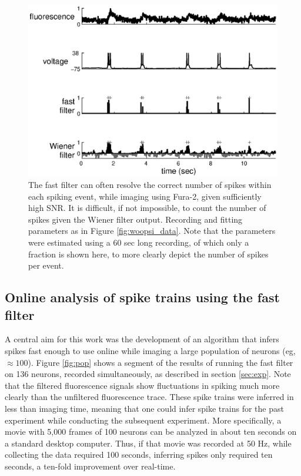 \documentclass{article}
\newcommand{\foopsi}{fast }
\begin{document}
\begin{figure}[h!]
\centering \includegraphics[width=.9\linewidth]{doublets_b12}
\caption[\foopsi filter outperforms Wiener filter on multi-spike events]{The \foopsi filter can often resolve the correct number of spikes within each spiking event, while imaging using Fura-2, given sufficiently high SNR.  It is difficult, if not impossible, to count the number of spikes given the Wiener filter output.  Recording and fitting parameters as in Figure \ref{fig:woopsi_data}. Note that the parameters were estimated using a 60 sec long recording, of which only a fraction is shown here, to more clearly depict the number of spikes per event.  } \label{fig:woopsi_data_doublets}
\end{figure}






\subsection{Online analysis of spike trains using the \foopsi filter}

A central aim for this work was the development of an algorithm that infers spikes fast enough to use online while imaging a large population of neurons (eg, $\approx 100$).  Figure \ref{fig:pop} shows a segment of the results of running the \foopsi filter on 136 neurons, recorded simultaneously, as described in section \ref{sec:exp}.  Note that the filtered fluorescence signals show fluctuations in spiking much more clearly than the unfiltered fluorescence trace. These spike trains were inferred in less than imaging time, meaning that one could infer spike trains for the past experiment while conducting the subsequent experiment. More specifically, a movie with 5,000 frames of 100 neurons can be analyzed in about ten seconds on a standard desktop computer.  Thus, if that movie was recorded at 50 Hz, while collecting the data required 100 seconds, inferring spikes only required ten seconds, a ten-fold improvement over real-time.  
\end{document}
